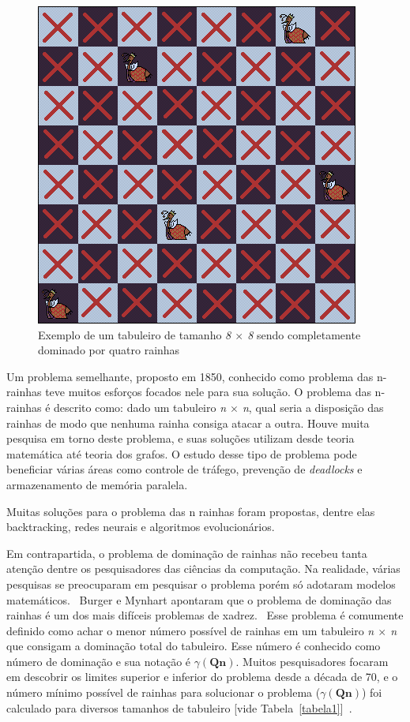 \documentclass[
	article,			%
	11pt,				%
	oneside,			%
	a4paper,			%
	english,			%
	brazil,				%
	sumario=tradicional
	]{abntex2}
\begin{document}
\begin{figure}
  \centering
  \includegraphics[width=0.60\linewidth]{dom2rainha8x8.png}
  \caption{Exemplo de um tabuleiro de tamanho \textit{8 $\times$ 8} sendo completamente dominado por
  quatro rainhas}
  \label{fig:2rainha}
\end{figure}

Um problema semelhante, proposto em 1850, conhecido como problema das n-rainhas teve muitos esforços focados nele para sua solução. O problema das n-rainhas é descrito como: dado um tabuleiro \textit{n $\times$ n}, qual seria a disposição das rainhas de modo que nenhuma rainha consiga atacar a outra. Houve muita pesquisa em torno deste problema, e suas soluções utilizam desde teoria matemática até teoria dos grafos. O estudo desse tipo de problema pode beneficiar várias áreas como controle de tráfego, prevenção de \textit{deadlocks} e armazenamento de memória paralela.~\cite{bell2009survey}

Muitas soluções para o problema das n rainhas foram propostas, dentre elas backtracking, redes neurais e algoritmos evolucionários.

Em contrapartida, o problema de dominação de rainhas não recebeu tanta atenção dentre os pesquisadores das ciências da computação. Na realidade, várias pesquisas se preocuparam em pesquisar o problema porém só adotaram modelos matemáticos.~\cite{alharbi2017genetic} Burger e Mynhart apontaram que o problema de dominação das rainhas é um dos mais difíceis problemas de xadrez.~\cite{art43}
Esse problema é comumente definido como achar o menor número possível de rainhas em um tabuleiro \textit{n $\times$ n} que consigam a dominação total do tabuleiro. Esse número é conhecido como número de dominação e sua notação é $\gamma(\textbf{Qn})$.
Muitos pesquisadores focaram em descobrir os limites superior e inferior do problema desde a década de 70,  e o número mínimo possível de rainhas para solucionar o problema ($\gamma(\textbf{Qn})$) foi calculado para diversos tamanhos de tabuleiro [vide Tabela~\ref{tabela1}]~\cite{art3,art43,art44,art45}.
\end{document}
